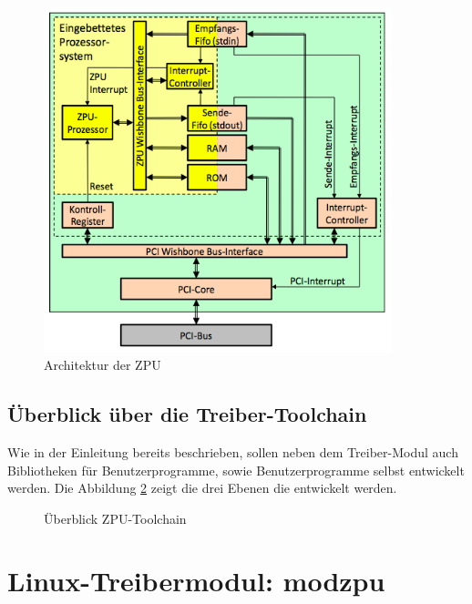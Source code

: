 \documentclass[11pt]{scrartcl}
\begin{document}
\begin{figure}[H]
	\begin{center}
		\includegraphics[width=0.9\textwidth]{images/zpu_architecture}
		\caption{Architektur der ZPU}
		\label{zpu_architecture}	
	\end{center}
\end{figure}



\subsection{Überblick über die Treiber-Toolchain}
Wie in der Einleitung bereits beschrieben, sollen neben dem Treiber-Modul auch Bibliotheken für Benutzerprogramme, sowie Benutzerprogramme selbst entwickelt werden. Die Abbildung \ref{zpu_overview} zeigt die drei Ebenen die entwickelt werden.

\begin{figure}[H]
	\begin{center}
		
		\caption{Überblick ZPU-Toolchain}
		\label{zpu_overview}	
	\end{center}
\end{figure}

\pagebreak
\section{Linux-Treibermodul: modzpu}
\end{document}
